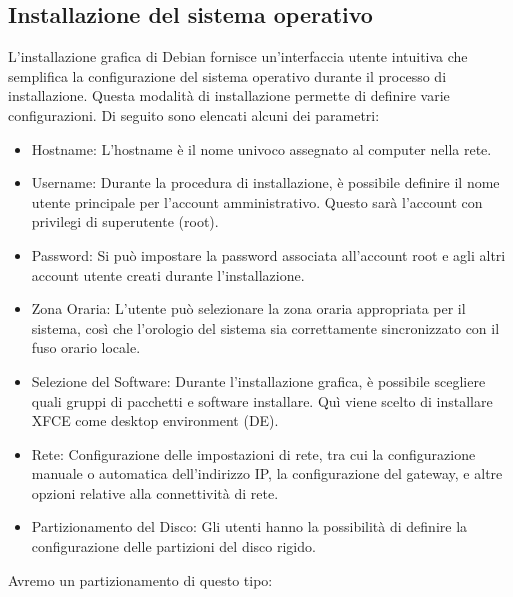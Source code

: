 \documentclass[11pt]{article}
\begin{document}
\subsection{Installazione del sistema operativo}
L'installazione grafica di Debian fornisce un'interfaccia utente intuitiva che semplifica la configurazione del sistema operativo durante il processo di installazione. Questa modalità di installazione permette di definire varie configurazioni. Di seguito sono elencati alcuni dei parametri:
\begin{itemize}
    \item Hostname: L'hostname è il nome univoco assegnato al computer nella rete.
    \item Username: Durante la procedura di installazione, è possibile definire il nome utente principale per l'account amministrativo. Questo sarà l'account con privilegi di superutente (root).
    \item Password: Si può impostare la password associata all'account root e agli altri account utente creati durante l'installazione.
    \item Zona Oraria: L'utente può selezionare la zona oraria appropriata per il sistema, così che l'orologio del sistema sia correttamente sincronizzato con il fuso orario locale.
    \item Selezione del Software: Durante l'installazione grafica, è possibile scegliere quali gruppi di pacchetti e software installare. Quì viene scelto di installare XFCE come desktop environment (DE).
    \item Rete: Configurazione delle impostazioni di rete, tra cui la configurazione manuale o automatica dell'indirizzo IP, la configurazione del gateway, e altre opzioni relative alla connettività di rete.
    \item Partizionamento del Disco: Gli utenti hanno la possibilità di definire la configurazione delle partizioni del disco rigido.
\end{itemize}
\pagebreak
Avremo un partizionamento di questo tipo:
\end{document}
